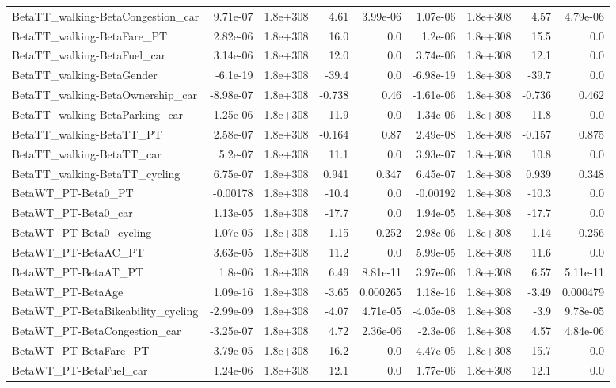 \begin{tabular}{lrrrrrrrr}
BetaTT_walking-BetaCongestion_car & 9.71e-07 & 1.8e+308 & 4.61 & 3.99e-06 & 1.07e-06 & 1.8e+308 & 4.57 & 4.79e-06 \\
BetaTT_walking-BetaFare_PT & 2.82e-06 & 1.8e+308 & 16.0 & 0.0 & 1.2e-06 & 1.8e+308 & 15.5 & 0.0 \\
BetaTT_walking-BetaFuel_car & 3.14e-06 & 1.8e+308 & 12.0 & 0.0 & 3.74e-06 & 1.8e+308 & 12.1 & 0.0 \\
BetaTT_walking-BetaGender & -6.1e-19 & 1.8e+308 & -39.4 & 0.0 & -6.98e-19 & 1.8e+308 & -39.7 & 0.0 \\
BetaTT_walking-BetaOwnership_car & -8.98e-07 & 1.8e+308 & -0.738 & 0.46 & -1.61e-06 & 1.8e+308 & -0.736 & 0.462 \\
BetaTT_walking-BetaParking_car & 1.25e-06 & 1.8e+308 & 11.9 & 0.0 & 1.34e-06 & 1.8e+308 & 11.8 & 0.0 \\
BetaTT_walking-BetaTT_PT & 2.58e-07 & 1.8e+308 & -0.164 & 0.87 & 2.49e-08 & 1.8e+308 & -0.157 & 0.875 \\
BetaTT_walking-BetaTT_car & 5.2e-07 & 1.8e+308 & 11.1 & 0.0 & 3.93e-07 & 1.8e+308 & 10.8 & 0.0 \\
BetaTT_walking-BetaTT_cycling & 6.75e-07 & 1.8e+308 & 0.941 & 0.347 & 6.45e-07 & 1.8e+308 & 0.939 & 0.348 \\
BetaWT_PT-Beta0_PT & -0.00178 & 1.8e+308 & -10.4 & 0.0 & -0.00192 & 1.8e+308 & -10.3 & 0.0 \\
BetaWT_PT-Beta0_car & 1.13e-05 & 1.8e+308 & -17.7 & 0.0 & 1.94e-05 & 1.8e+308 & -17.7 & 0.0 \\
BetaWT_PT-Beta0_cycling & 1.07e-05 & 1.8e+308 & -1.15 & 0.252 & -2.98e-06 & 1.8e+308 & -1.14 & 0.256 \\
BetaWT_PT-BetaAC_PT & 3.63e-05 & 1.8e+308 & 11.2 & 0.0 & 5.99e-05 & 1.8e+308 & 11.6 & 0.0 \\
BetaWT_PT-BetaAT_PT & 1.8e-06 & 1.8e+308 & 6.49 & 8.81e-11 & 3.97e-06 & 1.8e+308 & 6.57 & 5.11e-11 \\
BetaWT_PT-BetaAge & 1.09e-16 & 1.8e+308 & -3.65 & 0.000265 & 1.18e-16 & 1.8e+308 & -3.49 & 0.000479 \\
BetaWT_PT-BetaBikeability_cycling & -2.99e-09 & 1.8e+308 & -4.07 & 4.71e-05 & -4.05e-08 & 1.8e+308 & -3.9 & 9.78e-05 \\
BetaWT_PT-BetaCongestion_car & -3.25e-07 & 1.8e+308 & 4.72 & 2.36e-06 & -2.3e-06 & 1.8e+308 & 4.57 & 4.84e-06 \\
BetaWT_PT-BetaFare_PT & 3.79e-05 & 1.8e+308 & 16.2 & 0.0 & 4.47e-05 & 1.8e+308 & 15.7 & 0.0 \\
BetaWT_PT-BetaFuel_car & 1.24e-06 & 1.8e+308 & 12.1 & 0.0 & 1.77e-06 & 1.8e+308 & 12.1 & 0.0 \\

\end{tabular}
